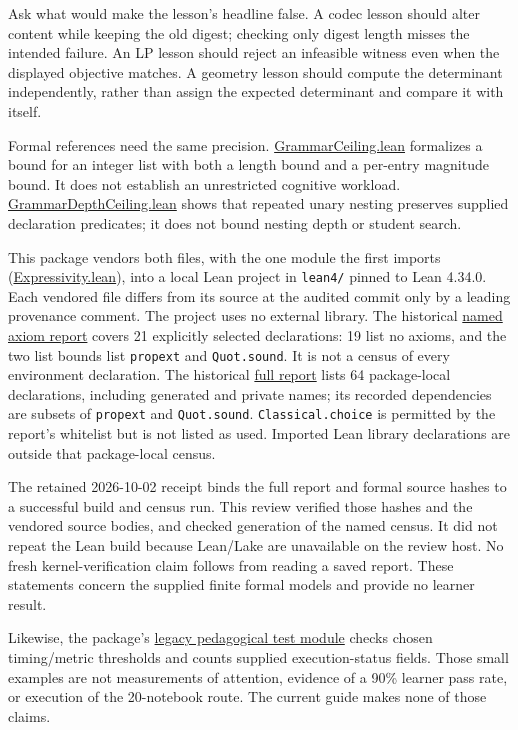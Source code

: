 \documentclass[
  11pt,
]{article}
\newcommand{\passthrough}[1]{#1}
\begin{document}
Ask what would make the lesson's headline false. A codec lesson should
alter content while keeping the old digest; checking only digest length
misses the intended failure. An LP lesson should reject an infeasible
witness even when the displayed objective matches. A geometry lesson
should compute the determinant independently, rather than assign the
expected determinant and compare it with itself.

Formal references need the same precision.
\href{lean4/GrammarCeiling.lean}{GrammarCeiling.lean} formalizes a bound
for an integer list with both a length bound and a per-entry magnitude
bound. It does not establish an unrestricted cognitive workload.
\href{lean4/GrammarDepthCeiling.lean}{GrammarDepthCeiling.lean} shows
that repeated unary nesting preserves supplied declaration predicates;
it does not bound nesting depth or student search.

This package vendors both files, with the one module the first imports
(\href{lean4/Expressivity.lean}{Expressivity.lean}), into a local Lean
project in \texttt{\nolinkurl{lean4/}} pinned to Lean 4.34.0. Each
vendored file differs from its source at the audited commit only by a
leading provenance comment. The project uses no external library. The
historical \href{lean4/axiom_report.txt}{named axiom report} covers 21
explicitly selected declarations: 19 list no axioms, and the two list
bounds list \passthrough{\lstinline!propext!} and
\passthrough{\lstinline!Quot.sound!}. It is not a census of every
environment declaration. The historical
\href{lean4/full_axiom_report.txt}{full report} lists 64 package-local
declarations, including generated and private names; its recorded
dependencies are subsets of \passthrough{\lstinline!propext!} and
\passthrough{\lstinline!Quot.sound!}.
\passthrough{\lstinline!Classical.choice!} is permitted by the report's
whitelist but is not listed as used. Imported Lean library declarations
are outside that package-local census.

The retained 2026-10-02 receipt binds the full report and formal source
hashes to a successful build and census run. This review verified those
hashes and the vendored source bodies, and checked generation of the
named census. It did not repeat the Lean build because Lean/Lake are
unavailable on the review host. No fresh kernel-verification claim
follows from reading a saved report. These statements concern the
supplied finite formal models and provide no learner result.

Likewise, the package's
\href{code/tests/test_007_pedagogical_transmission.py}{legacy
pedagogical test module} checks chosen timing/metric thresholds and
counts supplied execution-status fields. Those small examples are not
measurements of attention, evidence of a 90\% learner pass rate, or
execution of the 20-notebook route. The current guide makes none of
those claims.
\end{document}
